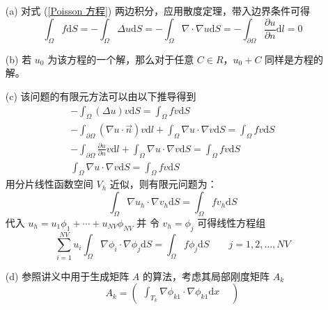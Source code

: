 \documentclass[a4paper]{article}
\begin{document}
\begin{enumerate}
    \item[(a)] 对式 (\ref{Poisson 方程}) 两边积分，应用散度定理，带入边界条件可得
    \begin{equation}
        \int_{\Omega} f \text{d}S = -\int_{\Omega} \Delta u \text{d}S 
                = -\int_{\Omega} \nabla \cdot \nabla u \text{d}S 
                = -\int_{\partial\Omega} \frac{\partial u}{\partial n}  \text{d}l 
                = 0
    \end{equation}
    \item[(b)] 若 $u_0$ 为该方程的一个解，那么对于任意 $C\in R$，$u_0+C$ 
                同样是方程的解。
    \item[(c)] 该问题的有限元方法可以由以下推导得到
    \begin{equation}
        \begin{gathered}
            -\int_{\Omega} (\Delta u) v \text{d}S = \int_{\Omega} f v \text{d}S\\
            -\int_{\partial\Omega} (\nabla u \cdot \vec{n}) v \text{d}l
            + \int_{\Omega} \nabla u \cdot \nabla v \text{d}S
            =\int_{\Omega} f v \text{d}S\\
            -\int_{\partial\Omega} \frac{\partial u}{\partial n} v \text{d}l
            + \int_{\Omega} \nabla u \cdot \nabla v \text{d}S
            =\int_{\Omega} f v \text{d}S\\
            \int_{\Omega} \nabla u \cdot \nabla v \text{d}S
            =\int_{\Omega} f v \text{d}S
        \end{gathered}
    \end{equation}
    用分片线性函数空间 $V_h$ 近似，则有限元问题为：
    \begin{equation}
        \int_{\Omega} \nabla u_h \cdot \nabla v_h \text{d}S
            =\int_{\Omega} f v_h \text{d}S
    \end{equation}
    代入 $u_h= u_1\phi_1 + \cdots + u_{NV}\phi_{NV}$ 并
    令 $v_h=\phi_j$ 可得线性方程组
    \begin{equation}
        \sum_{i=1}^{NV} u_i \int_{\Omega} \nabla \phi_i \cdot \nabla \phi_j \text{d}S
            =\int_{\Omega} f \phi_j \text{d}S \qquad j=1,2,\ldots,NV    
    \end{equation}
    \item[(d)] 参照讲义中用于生成矩阵 $A$ 的算法，考虑其局部刚度矩阵 $A_k$
    \begin{equation}
        A_k =
        \begin{pmatrix}
            \int_{T_k}\nabla \phi_{k1} \cdot \nabla \phi_{k1} \text{d}x &

\end{pmatrix}
\end{equation}
\end{enumerate}
\end{document}
